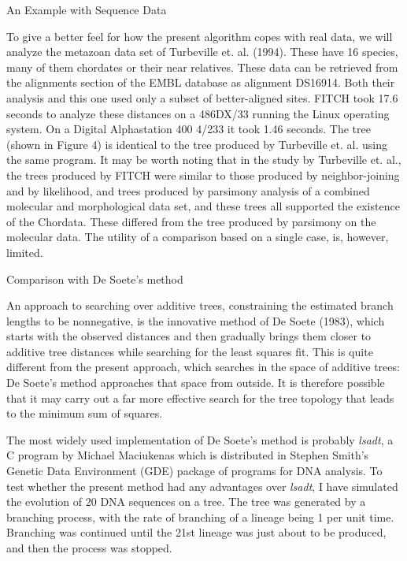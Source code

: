 \documentclass[12pt]{article}
\begin{document}
\centerline{\sc An Example with Sequence Data}
\bigskip

To give a better feel for how the present algorithm copes with real data,
we will analyze the metazoan data set of Turbeville et. al. (1994).  These
have 16 species, many of them chordates or their near relatives.
These data can be retrieved from the alignments section of the EMBL
database as alignment DS16914.  Both their analysis and this one used only
a subset of better-aligned sites.  FITCH
took 17.6 seconds to analyze these distances on a 486DX/33 running the
Linux operating system.  On a Digital Alphastation 400 4/233 it took 1.46
seconds.  The tree (shown in Figure 4) is identical to the tree produced
by Turbeville et. al. using the same program.  It may be worth noting that
in the study by Turbeville et. al., the trees produced by FITCH were
similar to those produced by neighbor-joining and by likelihood, and
trees produced by parsimony analysis of a combined molecular and morphological
data set, and these trees all supported the existence of the Chordata.
These differed from the tree produced by parsimony on the molecular
data.  The utility of a comparison based on a single case, is, however, limited.
\bigskip


\centerline{\sc Comparison with De Soete's method}
\bigskip

An approach to searching over additive trees, constraining the estimated
branch lengths to be nonnegative, is the innovative method of De Soete (1983),
which starts with the observed distances and then gradually brings them
closer to additive tree distances while searching for the least squares
fit.  This is quite different from the present approach, which searches in
the space of additive trees: De Soete's method approaches that space from
outside.  It is therefore possible that it may carry out a far more
effective search for the tree topology that leads to the minimum sum of
squares.

The most widely used implementation of De Soete's method is probably {\it lsadt},
a C program by Michael Maciukenas which is distributed in Stephen Smith's
Genetic Data Environment (GDE) package of programs for DNA analysis.
To test whether the present method had any advantages over {\it lsadt},
I have simulated the evolution of 20 DNA sequences on a tree.  The tree was
generated by a branching process, with the rate of branching of a lineage
being 1 per unit time.  Branching was continued until the 21st lineage
was just about to be produced, and then the process was stopped.
\end{document}
